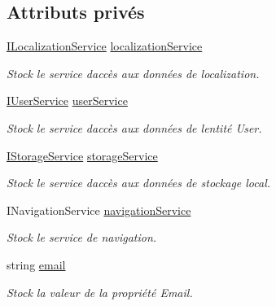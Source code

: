 \subsection*{Attributs privés}
\begin{DoxyCompactItemize}
\item 
\hyperlink{interface_boxes_1_1_services_1_1_localization_1_1_i_localization_service}{I\+Localization\+Service} \hyperlink{class_boxes_1_1_view_models_1_1_login_view_model_a16b58520549ca46282be67efae03e395}{localization\+Service}
\begin{DoxyCompactList}\small\item\em Stock le service d\textquotesingle{}accès aux données de localization. \end{DoxyCompactList}\item 
\hyperlink{interface_boxes_1_1_services_1_1_user_1_1_i_user_service}{I\+User\+Service} \hyperlink{class_boxes_1_1_view_models_1_1_login_view_model_a8cba7200b33227b306f2e67b41913ed6}{user\+Service}
\begin{DoxyCompactList}\small\item\em Stock le service d\textquotesingle{}accès aux données de l\textquotesingle{}entité User. \end{DoxyCompactList}\item 
\hyperlink{interface_boxes_1_1_services_1_1_storage_1_1_i_storage_service}{I\+Storage\+Service} \hyperlink{class_boxes_1_1_view_models_1_1_login_view_model_a0e1f19d329c368d76bc2872066a31fd6}{storage\+Service}
\begin{DoxyCompactList}\small\item\em Stock le service d\textquotesingle{}accès aux données de stockage local. \end{DoxyCompactList}\item 
I\+Navigation\+Service \hyperlink{class_boxes_1_1_view_models_1_1_login_view_model_a0381d903ddcdc0df8cd8ade8fb991120}{navigation\+Service}
\begin{DoxyCompactList}\small\item\em Stock le service de navigation. \end{DoxyCompactList}\item 
string \hyperlink{class_boxes_1_1_view_models_1_1_login_view_model_aa21af9c3a3edd71b2d56fb792bbe158a}{email}
\begin{DoxyCompactList}\small\item\em Stock la valeur de la propriété {\ttfamily Email}. \end{DoxyCompactList}\item 

\end{DoxyCompactItemize}
